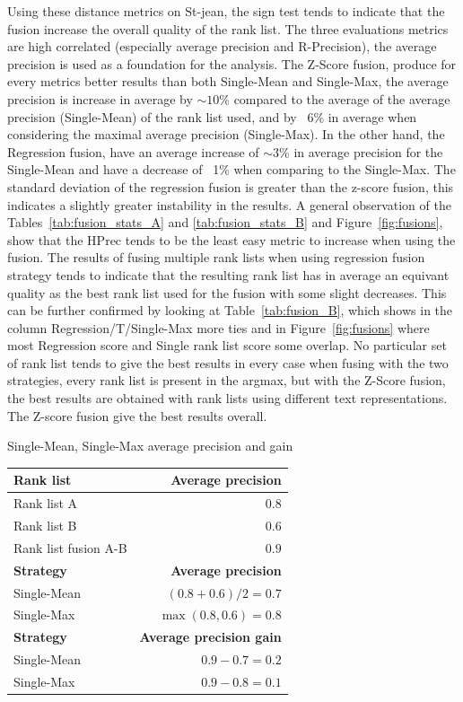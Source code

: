 Using these distance metrics on St-jean, the sign test tends to indicate that the fusion increase the overall quality of the rank list.
The three evaluations metrics are high correlated (especially average precision and R-Precision), the average precision is used as a foundation for the analysis.
The Z-Score fusion, produce for every metrics better results than both Single-Mean and Single-Max, the average precision is increase in average by $\sim 10$\% compared to the average of the average precision (Single-Mean) of the rank list used, and by ~6\% in average when considering the maximal average precision (Single-Max).
In the other hand, the Regression fusion, have an average increase of $\sim 3$\% in average precision for the Single-Mean and have a decrease of ~1\% when comparing to the Single-Max.
The standard deviation of the regression fusion is greater than the z-score fusion, this indicates a slightly greater instability in the results.
A general observation of the Tables~\ref{tab:fusion_stats_A} and \ref{tab:fusion_stats_B} and Figure~\ref{fig:fusions}, show that the HPrec tends to be the least easy metric to increase when using the fusion.
The results of fusing multiple rank lists when using regression fusion strategy tends to indicate that the resulting rank list has in average an equivant quality as the best rank list used for the fusion with some slight decreases.
This can be further confirmed by looking at Table~\ref{tab:fusion_B}, which shows in the column Regression/T/Single-Max more ties and in Figure~\ref{fig:fusions} where most Regression score and Single rank list score some overlap.
No particular set of rank list tends to give the best results in every case when fusing with the two strategies, every rank list is present in the argmax, but with the Z-Score fusion, the best results are obtained with rank lists using different text representations.
The Z-score fusion give the best results overall.

\begin{example}
  \centering
  \caption{Single-Mean, Single-Max average precision and gain}
  \label{ex:single_mean_single_max}
  \begin{tabular}{l r}
    \toprule
    \textbf{Rank list} & \textbf{Average precision} \\
    \midrule
    Rank list A & $0.8$ \\
    Rank list B & $0.6$ \\
    Rank list fusion A-B & $0.9$ \\
    \midrule
    \textbf{Strategy} & \textbf{Average precision} \\
    Single-Mean & $(0.8 + 0.6) / 2 = 0.7$ \\
    Single-Max & $\max(0.8, 0.6) = 0.8$ \\
    \midrule
    \textbf{Strategy} & \textbf{Average precision gain} \\
    Single-Mean & $0.9 - 0.7 = 0.2$ \\
    Single-Max & $0.9 - 0.8 = 0.1$ \\
    \bottomrule
  \end{tabular}
\end{example}

